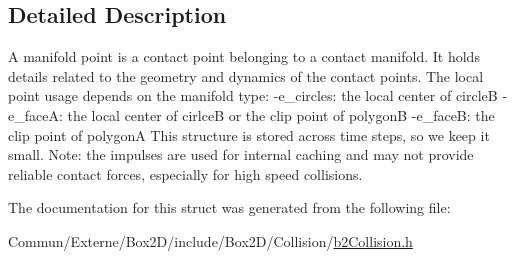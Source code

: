 \subsection{Detailed Description}
A manifold point is a contact point belonging to a contact manifold. It holds details related to the geometry and dynamics of the contact points. The local point usage depends on the manifold type\+: -\/e\+\_\+circles\+: the local center of circleB -\/e\+\_\+faceA\+: the local center of cirlceB or the clip point of polygonB -\/e\+\_\+faceB\+: the clip point of polygonA This structure is stored across time steps, so we keep it small. Note\+: the impulses are used for internal caching and may not provide reliable contact forces, especially for high speed collisions. 

The documentation for this struct was generated from the following file\+:\begin{DoxyCompactItemize}
\item 
Commun/\+Externe/\+Box2\+D/include/\+Box2\+D/\+Collision/\hyperlink{b2_collision_8h}{b2\+Collision.\+h}\end{DoxyCompactItemize}
